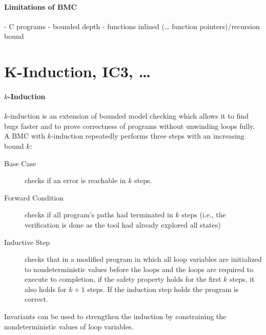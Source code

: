 \paragraph{Limitations of BMC}

- C programs
- bounded depth
- functions inlined (… function pointers)/recursion bound

\section{K-Induction, IC3, …}

\paragraph{$k$-Induction}

$k$-induction is an extension of bounded model checking which allows it to find bugs faster and to prove correctness of programs without unwinding loops fully.
A BMC with $k$-induction repeatedly performs three steps with an increasing bound $k$:
\begin{description}
    \item[Base Case] checks if an error is reachable in $k$ steps.
    \item[Forward Condition] checks if all program's paths had terminated in $k$ steps (i.e., the verification is done as the tool had already explored all states)
    \item[Inductive Step] checks that in a modified program in which all loop variables are initialized to nondeterministic values before the loops and the loops are required to execute to completion,\footnotemark{} if the safety property holds for the first $k$ steps, it also holds for $k+1$ steps. If the induction step holds the program is correct.
\end{description}
Invariants can be used to strengthen the induction by constraining the nondeterministic values of loop variables.
\cite{Cordeiro2016:23-27}

